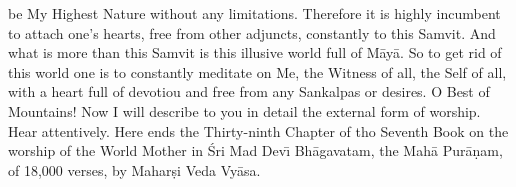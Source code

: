 be My Highest Nature without any limitations. Therefore it is highly incumbent to attach one's hearts, free from other adjuncts, constantly to this Samvit. And what is more than this Samvit is this illusive world full of M\=ay\=a. So to get rid of this world one is to constantly meditate on Me, the Witness of all, the Self of all, with a heart full of devotiou and free from any Sankalpas or desires.
O Best of Mountains! Now I will describe to you in detail the external form of worship. Hear attentively.
Here ends the Thirty-ninth Chapter of tho Seventh Book on the worship of the World Mother in \'Sri Mad Dev\={\i} Bh\=agavatam, the Mah\=a Pur\=a\d{n}am, of 18,000 verses, by Mahar\d{s}i Veda Vy\=asa.



